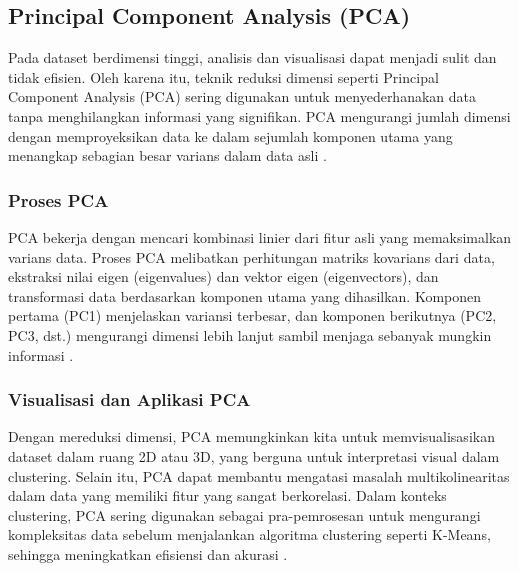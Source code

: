 \subsection{Principal Component Analysis (PCA)}
Pada dataset berdimensi tinggi, analisis dan visualisasi dapat menjadi sulit dan tidak efisien. Oleh karena itu, teknik reduksi dimensi seperti Principal Component Analysis (PCA) sering digunakan untuk menyederhanakan data tanpa menghilangkan informasi yang signifikan. PCA mengurangi jumlah dimensi dengan memproyeksikan data ke dalam sejumlah komponen utama yang menangkap sebagian besar varians dalam data asli \cite{PCAComponent}.

\subsubsection{Proses PCA}
PCA bekerja dengan mencari kombinasi linier dari fitur asli yang memaksimalkan varians data. Proses PCA melibatkan perhitungan matriks kovarians dari data, ekstraksi nilai eigen (eigenvalues) dan vektor eigen (eigenvectors), dan transformasi data berdasarkan komponen utama yang dihasilkan. Komponen pertama (PC1) menjelaskan variansi terbesar, dan komponen berikutnya (PC2, PC3, dst.) mengurangi dimensi lebih lanjut sambil menjaga sebanyak mungkin informasi \cite{PCAComponent}.

\subsubsection{Visualisasi dan Aplikasi PCA}
Dengan mereduksi dimensi, PCA memungkinkan kita untuk memvisualisasikan dataset dalam ruang 2D atau 3D, yang berguna untuk interpretasi visual dalam clustering. Selain itu, PCA dapat membantu mengatasi masalah multikolinearitas dalam data yang memiliki fitur yang sangat berkorelasi. Dalam konteks clustering, PCA sering digunakan sebagai pra-pemrosesan untuk mengurangi kompleksitas data sebelum menjalankan algoritma clustering seperti K-Means, sehingga meningkatkan efisiensi dan akurasi \cite{AbdiPCAVisualization}.

\newpage

